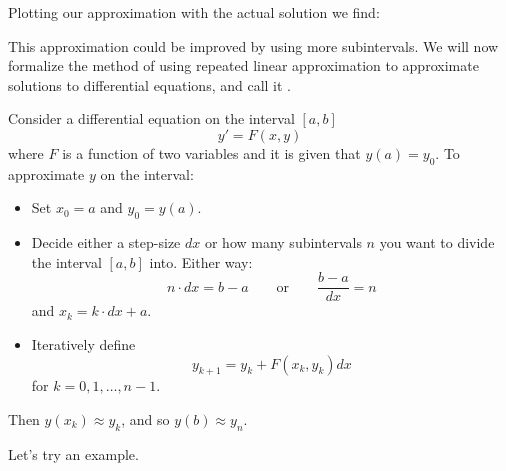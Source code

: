 \documentclass{ximera}
\begin{document}
Plotting our approximation with the actual solution we find:
\begin{image}
\end{image}
This approximation could be improved by using more subintervals.  We
will now formalize the method of using repeated linear approximation
to approximate solutions to differential equations, and call it
.

\begin{definition}
  Consider a differential equation on the interval $[a,b]$
  \[
  y' = F(x,y)
  \]
  where $F$ is a function of two variables and it is given that $y(a)
  = y_0$. To approximate $y$ on the interval:
  \begin{itemize}
  \item Set $x_0=a$ and $y_0 = y(a)$.
  \item Decide either a step-size $dx$ or how many subintervals $n$ you
    want to divide the interval $[a,b]$ into. Either way:
    \[
    n\cdot dx = b-a \qquad\text{or}\qquad \frac{b-a}{dx} = n
    \]
    and $x_k = k\cdot dx + a$.
  \item Iteratively define
    \[
    y_{k+1} = y_k + F(x_k,y_k)dx
    \]
    for $k=0,1,\dots,n-1$.
  \end{itemize}
  Then $y(x_k) \approx y_k$, and so $y(b) \approx y_{n}$.
\end{definition}

Let's try an example.
\end{document}
